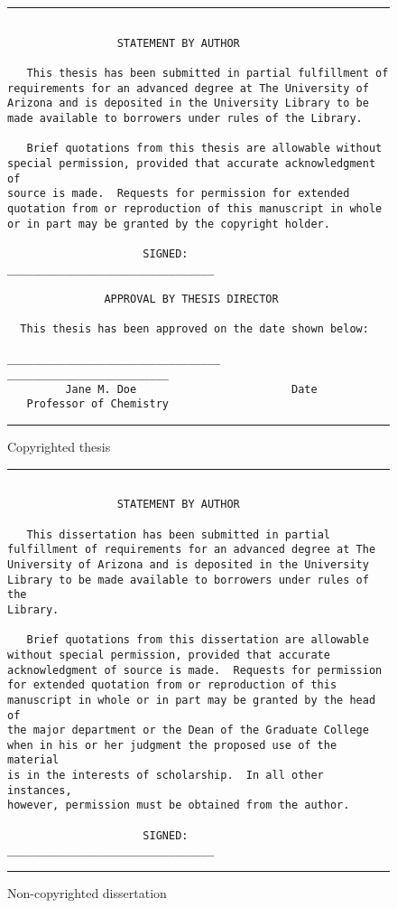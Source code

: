 \documentclass[draft]{ua-thesis}
\begin{document}
\begin{figure}
\hrule
\begin{verbatim}

                 STATEMENT BY AUTHOR

   This thesis has been submitted in partial fulfillment of
requirements for an advanced degree at The University of
Arizona and is deposited in the University Library to be
made available to borrowers under rules of the Library.

   Brief quotations from this thesis are allowable without
special permission, provided that accurate acknowledgment of
source is made.  Requests for permission for extended
quotation from or reproduction of this manuscript in whole
or in part may be granted by the copyright holder.

                     SIGNED: ________________________________

               APPROVAL BY THESIS DIRECTOR

  This thesis has been approved on the date shown below:

_________________________________  _________________________
         Jane M. Doe                        Date
   Professor of Chemistry

\end{verbatim}
\hrule
\caption{Copyrighted thesis} \label{f3}
\end{figure}

\begin{figure}
\hrule
\begin{verbatim}

                 STATEMENT BY AUTHOR

   This dissertation has been submitted in partial
fulfillment of requirements for an advanced degree at The
University of Arizona and is deposited in the University
Library to be made available to borrowers under rules of the
Library.

   Brief quotations from this dissertation are allowable
without special permission, provided that accurate
acknowledgment of source is made.  Requests for permission
for extended quotation from or reproduction of this
manuscript in whole or in part may be granted by the head of
the major department or the Dean of the Graduate College
when in his or her judgment the proposed use of the material
is in the interests of scholarship.  In all other instances,
however, permission must be obtained from the author.

                     SIGNED: ________________________________

\end{verbatim}
\hrule
\caption{Non-copyrighted dissertation} \label{f4}
\end{figure}
\end{document}
